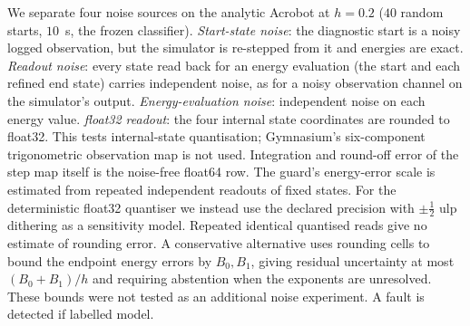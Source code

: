 \documentclass[10pt]{article}
\theoremstyle{definition}
\newcommand{\fittable}[2][\linewidth]{%
  \sbox{\tablebox}{#2}%
  \ifdim\wd\tablebox>#1\relax
    \resizebox{#1}{!}{\usebox{\tablebox}}%
  \else
    \usebox{\tablebox}%
  \fi}
\begin{document}
We separate four noise sources on
the analytic Acrobot at $h=0.2$ ($40$ random starts, $10$~s, the frozen
classifier). \emph{Start-state noise}: the diagnostic start is a noisy logged
observation, but the simulator is re-stepped from it and energies are exact.
\emph{Readout noise}: every state read back for an energy evaluation (the start
and each refined end state) carries independent noise, as for a noisy observation
channel on the simulator's output. \emph{Energy-evaluation noise}: independent
noise on each energy value. \emph{float32 readout}: the four internal state
coordinates are rounded to float32. This tests internal-state quantisation;
Gymnasium's six-component trigonometric observation map is not used.
Integration and round-off error of the step map
itself is the noise-free float64 row. The guard's energy-error scale is
estimated from repeated independent readouts of fixed states. For the
deterministic float32 quantiser we instead use the declared precision with
$\pm\tfrac12$ ulp dithering as a sensitivity model. Repeated identical
quantised reads give no estimate of rounding error. A conservative alternative
uses rounding cells to bound the endpoint energy errors by $B_0,B_1$, giving
residual uncertainty at most $(B_0+B_1)/h$ and requiring abstention when the
exponents are unresolved. These bounds were not tested as an additional noise
experiment. A fault is detected if labelled model.

\begin{table}[htbp]
\centering\small
\fittable{}
\caption{Operating envelope. Entries are the fraction of $40$ starts labelled
model, with the fraction labelled undetermined in parentheses; the healthy
column is the fraction flagged as non-consistent and the fraction
undetermined. A rate of $0.80$--$0.82$ has a $95\%$ Wilson interval of about
$[0.66,0.91]$.}
\label{tab:noisesrc}
\end{table}
\end{document}
